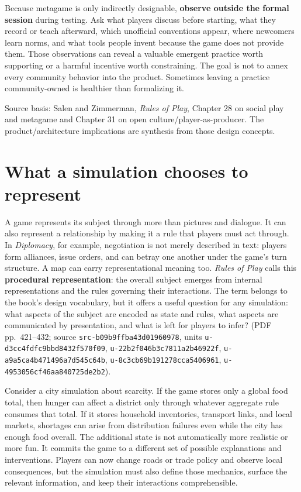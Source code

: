 Because metagame is only indirectly designable, \textbf{observe outside the formal session} during testing. Ask what players discuss before starting, what they record or teach afterward, which unofficial conventions appear, where newcomers learn norms, and what tools people invent because the game does not provide them. Those observations can reveal a valuable emergent practice worth supporting or a harmful incentive worth constraining. The goal is not to annex every community behavior into the product. Sometimes leaving a practice community-owned is healthier than formalizing it.

Source basis: Salen and Zimmerman, \emph{Rules of Play}, Chapter 28 on social play and metagame and Chapter 31 on open culture/player-as-producer. The product/architecture implications are synthesis from those design concepts.

\section{What a simulation chooses to represent}\label{06-engine-ii-ch046-what-a-simulation-chooses-to-represent}

\hypertarget{06-engine-ii-ch046-what-a-simulation-chooses-to-represent}{}

A game represents its subject through more than pictures and dialogue. It can also represent a relationship by making it a rule that players must act through. In \emph{Diplomacy}, for example, negotiation is not merely described in text: players form alliances, issue orders, and can betray one another under the game's turn structure. A map can carry representational meaning too. \emph{Rules of Play} calls this \textbf{procedural representation}: the overall subject emerges from internal representations and the rules governing their interactions. The term belongs to the book's design vocabulary, but it offers a useful question for any simulation: what aspects of the subject are encoded as state and rules, what aspects are communicated by presentation, and what is left for players to infer? (PDF pp.~421--432; source \texttt{src-b09b9ffba43d01960978}, units \texttt{u-d3cc4fdfc9bbd8432f570f09}, \texttt{u-22b2f046b3c7811a2b46922f}, \texttt{u-a9a5ca4b471496a7d545c64b}, \texttt{u-8c3cb69b191278cca5406961}, \texttt{u-4953056cf46aa840725de2b2}).

Consider a city simulation about scarcity. If the game stores only a global food total, then hunger can affect a district only through whatever aggregate rule consumes that total. If it stores household inventories, transport links, and local markets, shortages can arise from distribution failures even while the city has enough food overall. The additional state is not automatically more realistic or more fun. It commits the game to a different set of possible explanations and interventions. Players can now change roads or trade policy and observe local consequences, but the simulation must also define those mechanics, surface the relevant information, and keep their interactions comprehensible.

